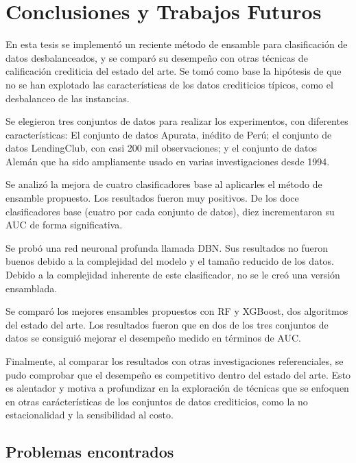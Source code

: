 \chapter{Conclusiones y Trabajos Futuros}\label{chap:conclusiones}


En esta tesis se implementó un reciente método de ensamble para clasificación de datos desbalanceados, y se comparó su desempeño con otras técnicas de calificación crediticia del estado del arte. Se tomó como base la hipótesis de que no se han explotado las características de los datos crediticios típicos, como el desbalanceo de las instancias.

Se elegieron tres conjuntos de datos para realizar los experimentos, con diferentes características: El conjunto de datos Apurata, inédito de Perú; el conjunto de datos LendingClub, con casi 200 mil observaciones; y el conjunto de datos Alemán que ha sido ampliamente usado en varias investigaciones desde 1994.

Se analizó la mejora de cuatro clasificadores base al aplicarles el método de ensamble propuesto. Los resultados fueron muy positivos. De los doce clasificadores base (cuatro por cada conjunto de datos), diez incrementaron su \ac{AUC} de forma significativa.

Se probó una red neuronal profunda llamada \ac{DBN}. Sus resultados no fueron buenos debido a la complejidad del modelo y el tamaño reducido de los datos. Debido a la complejidad inherente de este clasificador, no se le creó una versión ensamblada.

Se comparó los mejores ensambles propuestos con \ac{RF} y \ac{XGBoost}, dos algoritmos del estado del arte. Los resultados fueron que en dos de los tres conjuntos de datos se consiguió mejorar el desempeño medido en términos de \ac{AUC}.

Finalmente, al comparar los resultados con otras investigaciones referenciales, se pudo comprobar que el desempeño es competitivo dentro del estado del arte. Esto es alentador y motiva a profundizar en la exploración de técnicas que se enfoquen en otras carácterísticas de los conjuntos de datos crediticios, como la no estacionalidad y la sensibilidad al costo.


\section{Problemas encontrados}

